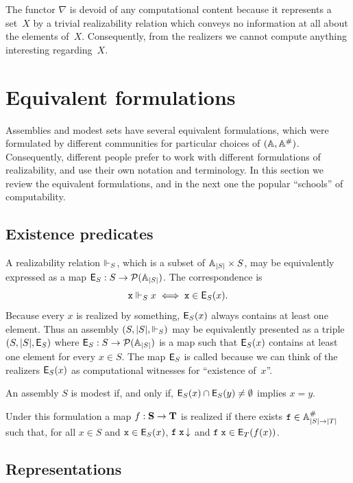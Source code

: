 The functor $\nabla$ is devoid of any computational content because it
represents a set~$X$ by a trivial realizability relation which conveys
no information at all about the elements of~$X$. Consequently, from
the realizers we cannot compute anything interesting regarding~$X$.


\section{Equivalent formulations}
\label{sec:equivalent-formulations}

Assemblies and modest sets have several equivalent formulations, which
were formulated by different communities for particular choices of
$(\mathbb{A}, \mathbb{A}^{\#})$. Consequently, different people prefer to work with
different formulations of realizability, and use their own notation
and terminology. In this section we review the equivalent
formulations, and in the next one the popular ``schools'' of
computability.

\subsection{Existence predicates}
\label{sec:existence-predicates}

A realizability relation $\Vdash_S$, which is a subset of $\mathbb{A}_{|S|}
\times S$, may be equivalently expressed as a map $\mathsf{E}_S : S \to
\mathcal{P}(\mathbb{A}_{|S|})$. The correspondence is
%
\begin{equation*}
  \mathtt{x} \Vdash_S x \iff \mathtt{x} \in \mathsf{E}_S(x).
\end{equation*}
%
Because every $x$ is realized by something, $\mathsf{E}_S(x)$ always contains
at least one element. Thus an assembly $(S, |S|, {\Vdash_{S}})$ may be equivalently
presented as a triple $(S, |S|, \mathsf{E}_S)$ where $\mathsf{E}_S : S \to
\mathcal{P}(\mathbb{A}_{|S|})$ is a map such that $\mathsf{E}_S(x)$ contains at least one
element for every $x \in S$. The map $\mathsf{E}_S$ is called  because we can think of the realizers $\mathsf{E}_S(x)$ as
computational witnesses for ``existence of~$x$''.

An assembly $S$ is modest if, and only if, $\mathsf{E}_S(x) \cap \mathsf{E}_S(y)
\neq \emptyset$ implies $x = y$.

Under this formulation a map $f : \mathbf{S} \to \mathbf{T}$ is realized if
there exists $\mathtt{f} \in \mathbb{A}^{\#}_{|S| \to |T|}$ such that, for all $x
\in S$ and $\mathtt{x} \in \mathsf{E}_S(x)$, $\mathtt{f}\;\mathtt{x}\,{\downarrow}$ and
$\mathtt{f}\;\mathtt{x} \in \mathsf{E}_T(f(x))$.

\subsection{Representations}
\label{sec:representations}

